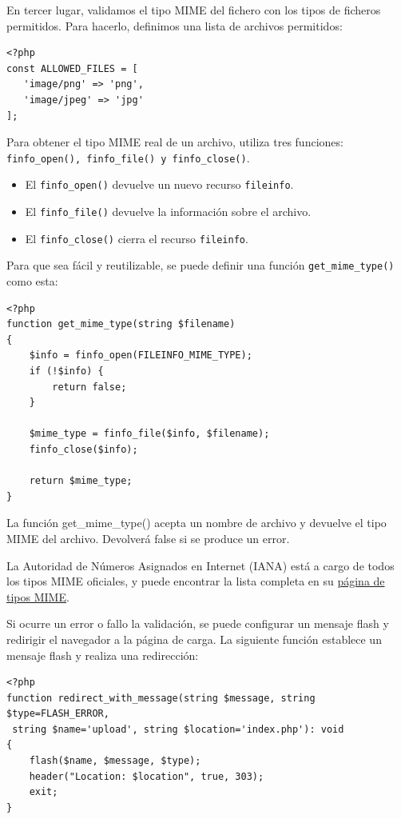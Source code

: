 \documentclass[11pt]{article}
\begin{document}
En tercer lugar, validamos el tipo MIME del fichero con los tipos de
ficheros permitidos. Para hacerlo, definimos una lista de archivos permitidos:
\begin{verbatim}
<?php
const ALLOWED_FILES = [
   'image/png' => 'png',
   'image/jpeg' => 'jpg'
];
\end{verbatim}


Para obtener el tipo MIME real de un archivo, utiliza tres funciones:
\texttt{finfo\_open(), finfo\_file() y finfo\_close()}.

\begin{itemize}
\item El \texttt{finfo\_open()} devuelve un nuevo recurso \texttt{fileinfo}.
\item El \texttt{finfo\_file()} devuelve la información sobre el archivo.
\item El \texttt{finfo\_close()} cierra el recurso \texttt{fileinfo}.
\end{itemize}

Para que sea fácil y reutilizable, se puede definir una función
\texttt{get\_mime\_type()} como esta:
\begin{verbatim}
<?php
function get_mime_type(string $filename)
{
    $info = finfo_open(FILEINFO_MIME_TYPE);
    if (!$info) {
        return false;
    }

    $mime_type = finfo_file($info, $filename);
    finfo_close($info);

    return $mime_type;
}
\end{verbatim}

La función get\_mime\_type() acepta un nombre de archivo y devuelve el
tipo MIME del archivo. Devolverá false si se produce un error.

\begin{mdframed}
La Autoridad de Números Asignados en Internet (IANA)
está a cargo de todos los tipos MIME oficiales, y puede encontrar la
lista completa en su \href{https://www.iana.org/assignments/media-types/media-types.xhtml}{página de tipos MIME}.
\end{mdframed}

Si ocurre un error o fallo la validación, se puede configurar un mensaje
flash y redirigir el navegador a la página de carga. La siguiente
función establece un mensaje flash y realiza una redirección:
\begin{verbatim}
<?php
function redirect_with_message(string $message, string $type=FLASH_ERROR,
 string $name='upload', string $location='index.php'): void
{
    flash($name, $message, $type);
    header("Location: $location", true, 303);
    exit;
}
\end{verbatim}
\end{document}
